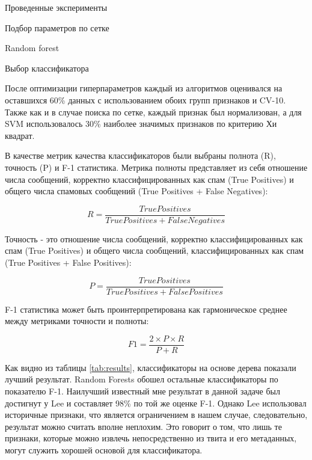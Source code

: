 \begin{section}{Проведенные эксперименты}
\begin{subsection}{Подбор параметров по сетке}
\begin{subsubsection}{Random forest}
\begin{table}[H]
  \caption{Подбор по сетке Random Forest}
  \label{grid:rf}
  \end{table}



\end{subsubsection}

\end{subsection}

\begin{subsection}{Выбор классификатора}

  После оптимизации гиперпараметров каждый из алгоритмов оценивался на оставшихся 60\% данных с использованием обоих групп признаков и CV-10. Также как и в случае поиска по сетке, каждый признак был нормализован, а для SVM использовалось 30\% наиболее значимых признаков по критерию Хи квадрат.


В качестве метрик качества классификаторов были выбраны полнота (R), точность (P) и F-1 статистика. Метрика полноты представляет из себя отношение числа сообщений, корректно классифицированных как спам (True Positives) и общего числа спамовых сообщений (True Positives + False Negatives):

\begin{equation}
  R = \frac{True Positives}{True Positives + False Negatives}
\end{equation}

Точность - это отношение числа сообщений, корректно классифицированных как спам (True Positives) и общего числа  сообщений, классифицированных как спам (True Positives + False Positives):

\begin{equation}
  P = \frac{True Positives}{True Positives + False Positives}
\end{equation}

F-1 статистика может быть проинтерпретирована как гармоническое среднее между метриками точности и полноты:

\begin{equation}
  F1 = \frac{2 \times P \times R}{P + R}
\end{equation}

Как видно из таблицы \ref{tab:results}, классификаторы на основе дерева показали лучший результат. Random Forests обошел остальные классификаторы по показателю F-1. Наилучший известный мне результат в данной задаче был достигнут у Lee \cite{Lee} и составляет 98\% по той же оценке F-1. Однако Lee использовал историчные признаки, что является ограничением в нашем случае, следовательно, результат можно считать вполне неплохим. Это говорит о том, что лишь те признаки, которые можно извлечь непосредственно из твита и его метаданных,  могут служить хорошей основой для классификатора.



\end{subsection}
\end{section}
